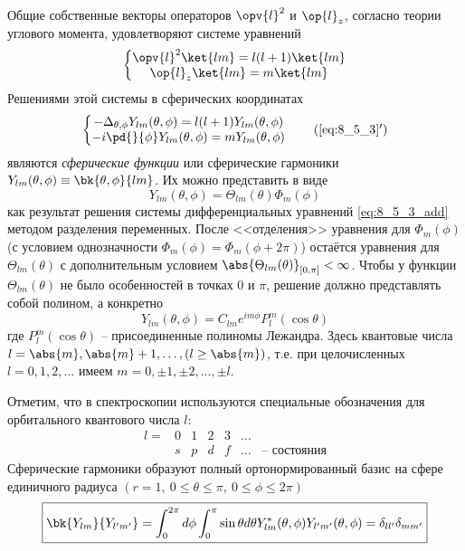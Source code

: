 Общие собственные векторы операторов $\opv{l}^2$ и $\op{l}_z$, согласно теории углового момента, удовлетворяют системе уравнений
\begin{equation}
\label{eq:8_5_3}
\left\{
  \begin{matrix}
    \opv{l}^2 \ket{lm} = l(l+1)\ket{lm} \\
    \op{l}_z \ket{lm} = m \ket{lm}
  \end{matrix}
\right.
\end{equation}%
%
Решениями этой системы в сферических координатах
\begin{equation}
\left\{
  \begin{matrix}
  \label{eq:8_5_3_add}
   - \Delta_{\theta, \phi} Y_{lm}(\theta, \phi) = l(l+1) Y_{lm}(\theta, \phi) 
    \\
     -i\pd{}{\phi} Y_{lm}(\theta, \phi) = m Y_{lm}(\theta, \phi) 
  \end{matrix}
\right .
\tag{\ref{eq:8_5_3}$'$}
\end{equation}%
%
являются {\em сферические функции} или {сферические гармоники} $Y_{lm}(\theta, \phi) \equiv \bk{\theta, \phi}{lm}$. Их можно представить в виде
$$
Y_{lm}(\theta, \phi) = \Theta_{lm}(\theta) \Phi_m(\phi)
$$%
%
как результат решения системы дифференциальных уравнений \eqref{eq:8_5_3_add} методом разделения переменных. После <<отделения>> уравнения для $\Phi_m(\phi)$ (с условием однозначности $\Phi_m(\phi) = \Phi_m(\phi + 2\pi)$) остаётся уравнения для $\Theta_{lm}(\theta)$ с дополнительным условием $\abs{\Theta_{lm}(\theta)}_{[0,\pi]} < \infty$. Чтобы у функции $\Theta_{lm}(\theta)$ не было особенностей в точках $0$ и $\pi$, решение должно представлять собой полином, а конкретно
$$
\boxed{
  Y_{lm}(\theta, \phi) = C_{lm} e^{im\phi} P^m_l(\cos \theta)
}
$$%
%
где  $P^m_l(\cos \theta)$ -- присоединенные полиномы Лежандра. Здесь квантовые числа $l = \abs{m}, \abs{m} + 1, \dots, (l \ge \abs{m})$, т.е. при целочисленных $l = 0, 1, 2, ...$ имеем $m = 0, \pm 1, \pm 2, ..., \pm l$.

Отметим, что в спектроскопии используются специальные обозначения для орбитального квантового числа $l$:
$$
\begin{matrix}
l =  & 0 & 1 & 2 & 3 & ... & \\
       & s & p & d & f & ... & \text{-- состояния}
\end{matrix}
$$%
%
Сферические гармоники образуют полный ортонормированный базис на сфере единичного радиуса $(r = 1,~0 \leqslant \theta \leqslant \pi,~0 \leqslant \phi \leqslant 2\pi)$
\begin{equation}
\label{eq:8_5_4}
\boxed{\bk{Y_{lm}}{Y_{l'm'}} = \int_0^{2\pi} d\phi \int_0^\pi \sin \theta d \theta Y^*_{lm}(\theta, \phi) Y_{l'm'}(\theta, \phi) = \delta_{ll'} \delta_{mm'}}
\end{equation}